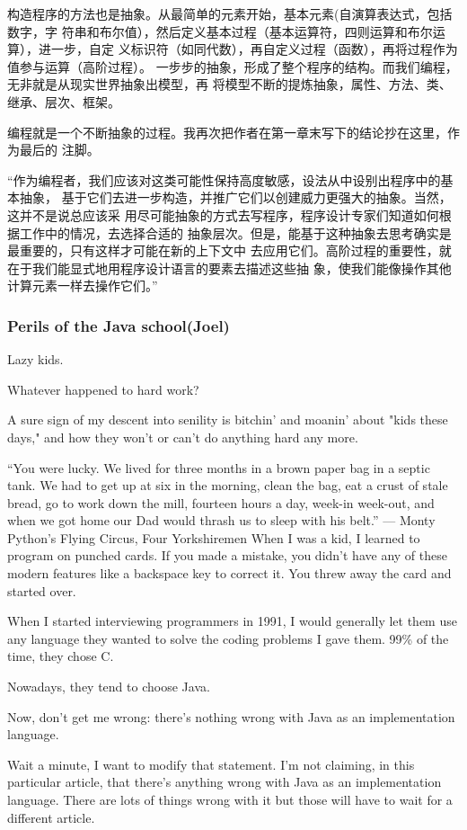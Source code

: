 \documentclass[11pt]{article}
\begin{document}
构造程序的方法也是抽象。从最简单的元素开始，基本元素(自演算表达式，包括数字，字
符串和布尔值），然后定义基本过程（基本运算符，四则运算和布尔运算），进一步，自定
义标识符（如同代数），再自定义过程（函数），再将过程作为值参与运算（高阶过程）。
一步步的抽象，形成了整个程序的结构。而我们编程，无非就是从现实世界抽象出模型，再
将模型不断的提炼抽象，属性、方法、类、继承、层次、框架。

编程就是一个不断抽象的过程。我再次把作者在第一章末写下的结论抄在这里，作为最后的
注脚。

“作为编程者，我们应该对这类可能性保持高度敏感，设法从中设别出程序中的基本抽象，
基于它们去进一步构造，并推广它们以创建威力更强大的抽象。当然，这并不是说总应该采
用尽可能抽象的方式去写程序，程序设计专家们知道如何根据工作中的情况，去选择合适的
抽象层次。但是，能基于这种抽象去思考确实是最重要的，只有这样才可能在新的上下文中
去应用它们。高阶过程的重要性，就在于我们能显式地用程序设计语言的要素去描述这些抽
象，使我们能像操作其他计算元素一样去操作它们。”
\subsubsection*{Perils of the Java school(Joel)}
\label{sec:orgheadline152}
Lazy kids.

Whatever happened to hard work?

A sure sign of my descent into senility is bitchin' and moanin' about "kids
these days," and how they won't or can't do anything hard any more.

“You were lucky. We lived for three months in a brown paper bag in a septic
tank. We had to get up at six in the morning, clean the bag, eat a crust of
stale bread, go to work down the mill, fourteen hours a day, week-in week-out,
and when we got home our Dad would thrash us to sleep with his belt.” — Monty
Python's Flying Circus, Four Yorkshiremen When I was a kid, I learned to program
on punched cards. If you made a mistake, you didn't have any of these modern
features like a backspace key to correct it. You threw away the card and started
over.

When I started interviewing programmers in 1991, I would generally let them use
any language they wanted to solve the coding problems I gave them. 99\% of the
time, they chose C.

Nowadays, they tend to choose Java.

Now, don't get me wrong: there's nothing wrong with Java as an implementation
language.

Wait a minute, I want to modify that statement. I'm not claiming, in this
particular article, that there's anything wrong with Java as an implementation
language. There are lots of things wrong with it but those will have to wait for
a different article.
\end{document}
